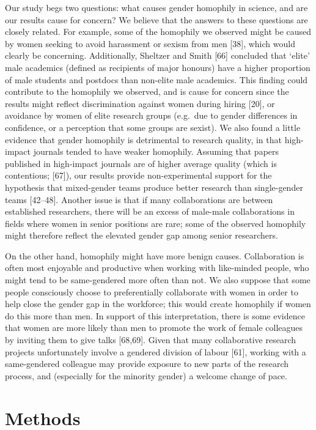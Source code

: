 \documentclass[12pt,]{article}
\begin{document}
Our study begs two questions: what causes gender homophily in science,
and are our results cause for concern? We believe that the answers to
these questions are closely related. For example, some of the homophily
we observed might be caused by women seeking to avoid harassment or
sexism from men {[}38{]}, which would clearly be concerning.
Additionally, Sheltzer and Smith {[}66{]} concluded that `elite' male
academics (defined as recipients of major honours) have a higher
proportion of male students and postdocs than non-elite male academics.
This finding could contribute to the homophily we observed, and is cause
for concern since the results might reflect discrimination against women
during hiring {[}20{]}, or avoidance by women of elite research groups
(e.g.~due to gender differences in confidence, or a perception that some
groups are sexist). We also found a little evidence that gender
homophily is detrimental to research quality, in that high-impact
journals tended to have weaker homophily. Assuming that papers published
in high-impact journals are of higher average quality (which is
contentious; {[}67{]}), our results provide non-experimental support for
the hypothesis that mixed-gender teams produce better research than
single-gender teams {[}42--48{]}. Another issue is that if many
collaborations are between established researchers, there will be an
excess of male-male collaborations in fields where women in senior
positions are rare; some of the observed homophily might therefore
reflect the elevated gender gap among senior researchers.

On the other hand, homophily might have more benign causes.
Collaboration is often most enjoyable and productive when working with
like-minded people, who might tend to be same-gendered more often than
not. We also suppose that some people consciously choose to
preferentially collaborate with women in order to help close the gender
gap in the workforce; this would create homophily if women do this more
than men. In support of this interpretation, there is some evidence that
women are more likely than men to promote the work of female colleagues
by inviting them to give talks {[}68,69{]}. Given that many
collaborative research projects unfortunately involve a gendered
division of labour {[}61{]}, working with a same-gendered colleague may
provide exposure to new parts of the research process, and (especially
for the minority gender) a welcome change of pace.

\hypertarget{methods}{%
\section{Methods}\label{methods}}
\end{document}
